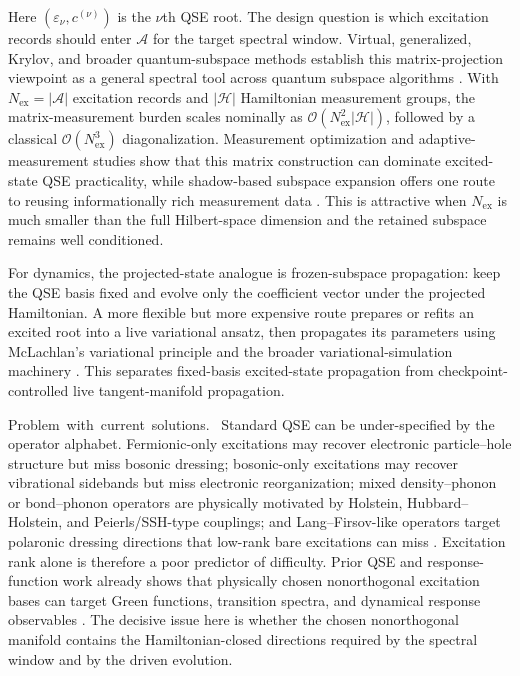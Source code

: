 \documentclass[
  reprint,
  amsmath,
  amssymb,
  aps,
  pra,
  nofootinbib,
  superscriptaddress,
  floatfix
]{revtex4-2}
\newcommand{\tentative}[1]{\textcolor{red!70!black}{#1}}
\newcommand{\structlabel}[1]{\noindent\mbox{\tentative{#1.}}~}
\newcommand{\Hcal}{\mathcal{H}}
\newcommand{\Acal}{\mathcal{A}}
\newcommand{\ex}{\mathrm{ex}}
\begin{document}
Here \((\varepsilon_\nu,c^{(\nu)})\) is the \(\nu\)th QSE root.  The design question is which excitation records should enter \(\Acal\) for the target spectral window.  Virtual, generalized, Krylov, and broader quantum-subspace methods establish this matrix-projection viewpoint as a general spectral tool across quantum subspace algorithms \cite{Urbanek2020VQSE,Yoshioka2022GQSE,CortesGray2022QKSD,Motta2024SubspaceReview}.  With \(N_{\ex}=|\Acal|\) excitation records and \(|\Hcal|\) Hamiltonian measurement groups, the matrix-measurement burden scales nominally as \(\mathcal O(N_{\ex}^2|\Hcal|)\), followed by a classical \(\mathcal O(N_{\ex}^3)\) diagonalization.  Measurement optimization and adaptive-measurement studies show that this matrix construction can dominate excited-state QSE practicality, while shadow-based subspace expansion offers one route to reusing informationally rich measurement data \cite{ChoiIzmaylov2023MeasurementQSE,Nakamura2024AdaptiveMeasurementQSE,Boyd2025ShadowSubspace,Fischer2025ShadowQSE}.  This is attractive when \(N_{\ex}\) is much smaller than the full Hilbert-space dimension and the retained subspace remains well conditioned.

For dynamics, the projected-state analogue is frozen-subspace propagation: keep the QSE basis fixed and evolve only the coefficient vector under the projected Hamiltonian.  A more flexible but more expensive route prepares or refits an excited root into a live variational ansatz, then propagates its parameters using McLachlan's variational principle and the broader variational-simulation machinery \cite{McLachlan1964,Yuan2019VQS,Barison2021PVQD,Yao2021AVQDS,Linteau2024APVQD,Zhang2025CompressedAVQD}.  This separates fixed-basis excited-state propagation from checkpoint-controlled live tangent-manifold propagation.

\structlabel{Problem with current solutions}
Standard QSE can be under-specified by the operator alphabet.  Fermionic-only excitations may recover electronic particle--hole structure but miss bosonic dressing; bosonic-only excitations may recover vibrational sidebands but miss electronic reorganization; mixed density--phonon or bond--phonon operators are physically motivated by Holstein, Hubbard--Holstein, and Peierls/SSH-type couplings; and Lang--Firsov-like operators target polaronic dressing directions that low-rank bare excitations can miss \cite{Holstein1959,FehskeTrugman2007HolsteinPolaron,HohenadlerLinden2007LangFirsov,SuSchriefferHeeger1979}.  Excitation rank alone is therefore a poor predictor of difficulty.  Prior QSE and response-function work already shows that physically chosen nonorthogonal excitation bases can target Green functions, transition spectra, and dynamical response observables \cite{Jamet2022GreenQSE,Dhawan2024ImagTimeGreen,Gauthier2024OccupationQSE,Kokcu2024LinearResponse,Umeano2025KitaevQSE}.  The decisive issue here is whether the chosen nonorthogonal manifold contains the Hamiltonian-closed directions required by the spectral window and by the driven evolution.
\end{document}

